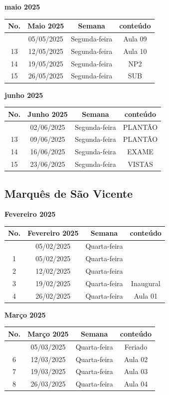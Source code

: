 \documentclass[
]{book}
\begin{document}
\textbf{maio 2025}

\begin{longtable}[]{@{}cccc@{}}
\toprule\noalign{}
No. & Maio 2025 & Semana & conteúdo \\
\midrule\noalign{}
\endhead
\bottomrule\noalign{}
\endlastfoot
12 & 05/05/2025 & Segunda-feira & Aula 09 \\
13 & 12/05/2025 & Segunda-feira & Aula 10 \\
14 & 19/05/2025 & Segunda-feira & NP2 \\
15 & 26/05/2025 & Segunda-feira & SUB \\
\end{longtable}

\textbf{junho 2025}

\begin{longtable}[]{@{}cccc@{}}
\toprule\noalign{}
No. & Junho 2025 & Semana & conteúdo \\
\midrule\noalign{}
\endhead
\bottomrule\noalign{}
\endlastfoot
12 & 02/06/2025 & Segunda-feira & PLANTÃO \\
13 & 09/06/2025 & Segunda-feira & PLANTÃO \\
14 & 16/06/2025 & Segunda-feira & EXAME \\
15 & 23/06/2025 & Segunda-feira & VISTAS \\
\end{longtable}

\subsection{Marquês de São Vicente}\label{marquuxeas-de-suxe3o-vicente}

\textbf{Fevereiro 2025}

\begin{longtable}[]{@{}cccc@{}}
\toprule\noalign{}
No. & Fevereiro 2025 & Semana & conteúdo \\
\midrule\noalign{}
\endhead
\bottomrule\noalign{}
\endlastfoot
1 & 05/02/2025 & Quarta-feira & \\
1 & 05/02/2025 & Quarta-feira & \\
2 & 12/02/2025 & Quarta-feira & \\
3 & 19/02/2025 & Quarta-feira & Inaugural \\
4 & 26/02/2025 & Quarta-feira & Aula 01 \\
\end{longtable}

\textbf{Março 2025}

\begin{longtable}[]{@{}cccc@{}}
\toprule\noalign{}
No. & Março 2025 & Semana & conteúdo \\
\midrule\noalign{}
\endhead
\bottomrule\noalign{}
\endlastfoot
5 & 05/03/2025 & Quarta-feira & Feriado \\
6 & 12/03/2025 & Quarta-feira & Aula 02 \\
7 & 19/03/2025 & Quarta-feira & Aula 03 \\
8 & 26/03/2025 & Quarta-feira & Aula 04 \\
\end{longtable}
\end{document}
